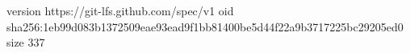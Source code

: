 version https://git-lfs.github.com/spec/v1
oid sha256:1eb99d083b1372509eae93ead9f1bb81400be5d44f22a9b3717225bc29205ed0
size 337

